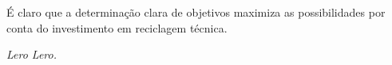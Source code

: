 \begin{epigrafe}
\vspace*{\fill}
\begin{flushright}
\parbox{0.7\linewidth}{
É claro que a determinação clara de objetivos maximiza as possibilidades por conta do investimento em reciclagem técnica.
		
\raggedleft\textit{Lero Lero.}
}
\end{flushright}
\vspace{2cm}
\end{epigrafe}